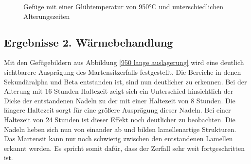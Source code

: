 \documentclass[a4paper, 11pt]{tubsreprt}
\begin{document}
\begin{figure} %
    \caption{Gefüge mit einer Glühtemperatur von 950°C und unterschiedlichen Alterungszeiten}
    \label{Glühung950+alterung}
\end{figure}
\subsection{Ergebnisse 2. Wärmebehandlung}
Mit den Gefügebildern aus Abbildung \ref{950 lange auslagerung} wird eine deutlich sichtbarere Ausprägung des Martensitzerfalls festgestellt. Die Bereiche in denen Sekundäralpha und Beta entstanden ist, sind nun deutlicher zu erkennen. Bei der Alterung mit 16 Stunden Haltezeit zeigt sich ein Unterschied hinsichtlich der Dicke der entstandenen Nadeln zu der mit einer Haltezeit von 8 Stunden. Die längere Haltezeit sorgt für eine größere Ausprägung dieser Nadeln. Bei einer Haltezeit von 24 Stunden ist dieser Effekt noch deutlicher zu beobachten. Die Nadeln heben sich nun von einander ab und bilden lamellenartige Strukturen. Das Martensit kann nur noch schwierig zwischen den entstandenen Lamellen erkannt werden. Es spricht somit dafür, dass der Zerfall sehr weit fortgeschritten ist. 
\end{document}
